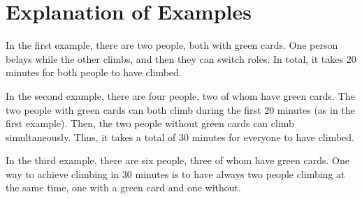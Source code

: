 \section*{Explanation of Examples}

In the first example, there are two people, both with green cards. One person belays while the other climbs, and then they can switch roles. In total, it takes $20$ minutes for both people to have climbed.

In the second example, there are four people, two of whom have green cards. The two people with green cards can both climb during the first $20$ minutes (as in the first example). Then, the two people without green cards can climb simultaneously. Thus, it takes a total of $30$ minutes for everyone to have climbed.

In the third example, there are six people, three of whom have green cards. One way to achieve climbing in $30$ minutes is to have always two people climbing at the same time, one with a green card and one without.
